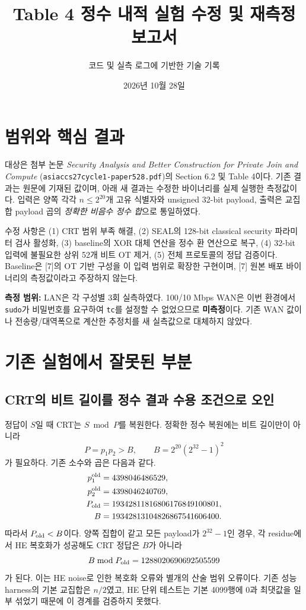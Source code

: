 \documentclass[11pt,a4paper]{article}
\title{Table 4 정수 내적 실험 수정 및 재측정 보고서}
\author{코드 및 실측 로그에 기반한 기술 기록}
\date{2026년 10월 28일}
\begin{document}
\maketitle

\section{범위와 핵심 결과}
대상은 첨부 논문 \textit{Security Analysis and Better Construction for Private Join and Compute}
(\texttt{asiaccs27cycle1-paper528.pdf})의 Section 6.2 및 Table 4이다.
기존 결과는 원문에 기재된 값이며, 아래 새 결과는 수정한 바이너리를 실제 실행한 측정값이다.
입력은 양쪽 각각 $n\le 2^{20}$개 고유 식별자와 unsigned 32-bit payload,
출력은 교집합 payload 곱의 \emph{정확한 비음수 정수 합}으로 통일하였다.

수정 사항은 (1) CRT 범위 부족 해결, (2) SEAL의 128-bit classical security 파라미터 검사 활성화,
(3) baseline의 XOR 대체 연산을 정수 환 연산으로 복구,
(4) 32-bit 입력에 불필요한 상위 52개 비트 OT 제거,
(5) 전체 프로토콜의 정답 검증이다.
Baseline은 [7]의 OT 기반 구성을 이 입력 범위로 확장한 구현이며,
[7] 원본 배포 바이너리의 측정값이라고 주장하지 않는다.

\textbf{측정 범위:} LAN은 각 구성별 3회 실측하였다.
100/10 Mbps WAN은 이번 환경에서 \texttt{sudo}가 비밀번호를 요구하여
\texttt{tc}를 설정할 수 없었으므로 \textbf{미측정}이다.
기존 WAN 값이나 전송량/대역폭으로 계산한 추정치를 새 실측값으로 대체하지 않았다.

\section{기존 실험에서 잘못된 부분}
\subsection{CRT의 비트 길이를 정수 결과 수용 조건으로 오인}
정답이 $S$일 때 CRT는 $S\bmod P$를 복원한다.
정확한 정수 복원에는 비트 길이만이 아니라
\[
P=p_1p_2 > B,\qquad B=2^{20}(2^{32}-1)^2
\]
가 필요하다. 기존 소수와 곱은 다음과 같다.
\begin{align*}
p_1^{\rm old}&=4398046486529,\\
p_2^{\rm old}&=4398046240769,\\
P_{\rm old}&=19342811816806176849100801,\\
B&=19342813104826867541606400.
\end{align*}
따라서 $P_{\rm old}<B$이다. 양쪽 집합이 같고 모든 payload가 $2^{32}-1$인 경우,
각 residue에서 HE 복호화가 성공해도 CRT 정답은 $B$가 아니라
\[
 B\bmod P_{\rm old}=1288020690692505599
\]
가 된다. 이는 HE noise로 인한 복호화 오류와 별개의 산술 범위 오류이다.
기존 성능 harness의 기본 교집합은 $n/2$였고,
HE 단위 테스트는 기본 4099행에 0과 최댓값을 일부 섞었기 때문에 이 경계를 검증하지 못했다.
\end{document}
